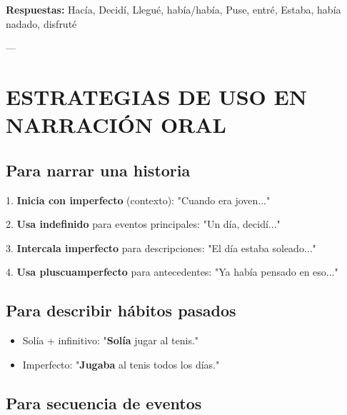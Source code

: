 \documentclass[a4paper,11pt]{article}
\begin{document}
\vspace{0.2cm}

\textbf{Respuestas:} Hacía, Decidí, Llegué, había/había, Puse, entré, Estaba, había nadado, disfruté

\vspace{0.2cm}

---

\vspace{0.2cm}

\section{ESTRATEGIAS DE USO EN NARRACIÓN ORAL}

\vspace{0.2cm}

\subsection{Para narrar una historia}

1. \textbf{Inicia con imperfecto} (contexto): "Cuando era joven..."

2. \textbf{Usa indefinido} para eventos principales: "Un día, decidí..."

3. \textbf{Intercala imperfecto} para descripciones: "El día estaba soleado..."

4. \textbf{Usa pluscuamperfecto} para antecedentes: "Ya había pensado en eso..."

\vspace{0.2cm}

\subsection{Para describir hábitos pasados}

\begin{itemize}

  \item Solía + infinitivo: "\textbf{Solía} jugar al tenis."

  \item Imperfecto: "\textbf{Jugaba} al tenis todos los días."

\end{itemize}

\vspace{0.2cm}

\subsection{Para secuencia de eventos}
\end{document}
